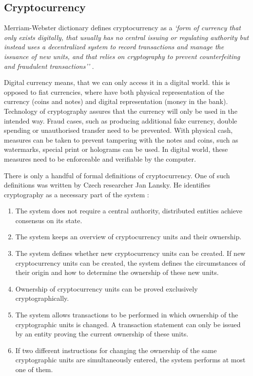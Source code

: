 \subsection{Cryptocurrency}
% 
Merriam-Webster dictionary defines cryptocurrency as a \textit{`form of currency that only exists digitally, that usually has no central issuing or regulating authority but instead uses a decentralized system to record transactions and manage the issuance of new units, and that relies on cryptography to prevent counterfeiting and fraudulent transactions''} \footnotemark.
% 
% 

Digital currency means, that we can only access it in a digital world. this is opposed to fiat currencies, where have both physical representation of the currency (coins and notes) and digital representation (money in the bank). Technology of cryptography assures that the currency will only be used in the intended way. Fraud cases, such as producing additional fake currency, double spending or unauthorised transfer need to be prevented. With physical cash, measures can be taken to prevent tampering with the notes and coins, such as watermarks, special print or holograms can be used. In digital world, these measures need to be enforceable and verifiable by the computer.

There is only a handful of formal definitions of cryptocurrency. One of such definitions was written by Czech researcher Jan Lansky. He identifies cryptography as a necessary part of the system \cite{Lansky2018PossibleCryptocurrencies}:
\begin{enumerate}[noitemsep]
    \item The system does not require a central authority, distributed entities achieve consensus on its state.
    \item The system keeps an overview of cryptocurrency units and their ownership.
    \item The system defines whether new cryptocurrency units can be created. If new cryptocurrency units can  be  created,  the  system  defines  the  circumstances  of  their  origin  and  how  to  determine  the ownership of these new units.
    \item Ownership of cryptocurrency units can be proved exclusively cryptographically.
    \item The system allows transactions to be performed in  which ownership of the cryptographic units is changed. A transaction statement can only be issued by an entity proving the current ownership of these units.
    \item If  two  different  instructions  for  changing  the  ownership  of the  same  cryptographic  units  are simultaneously entered, the system performs at most one of them.
\end{enumerate}

